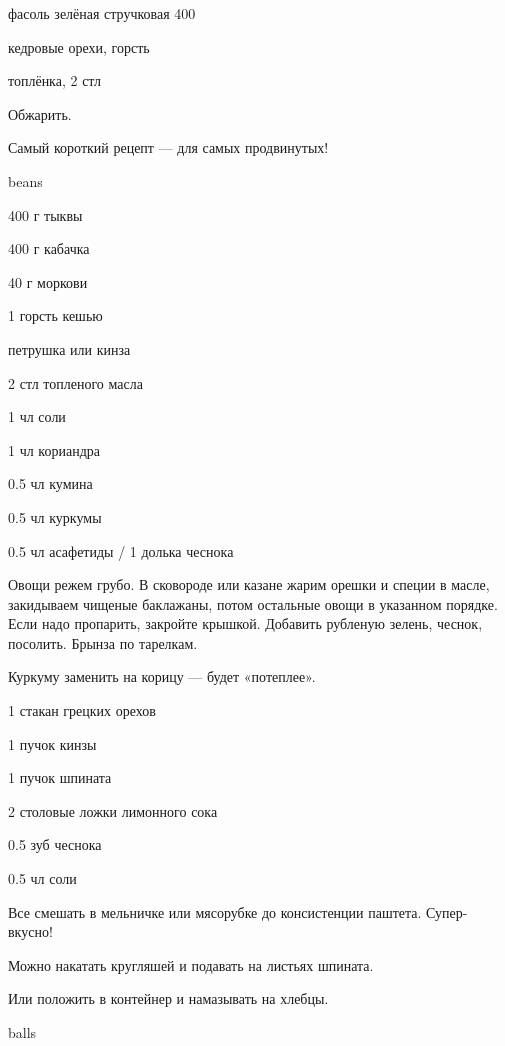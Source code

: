 {
\item фасоль зелёная стручковая 400
\item кедровые орехи, горсть
\item топлёнка, 2 стл
}{
\item[]
}{
Обжарить.
}{
\begin{advice}
\item Самый короткий рецепт — для самых продвинутых!
\end{advice}}{beans}



{
\item 400 г тыквы
\item 400 г кабачка
\item 40 г моркови
\item 1 горсть кешью
\item петрушка или кинза
\item 2 стл топленого масла
}{
\item 1 чл соли
\item 1 чл кориандра
\item 0.5 чл кумина
\item 0.5 чл куркумы
\item 0.5 чл асафетиды / 1 долька чеснока
}{
Овощи режем грубо. В сковороде или казане жарим орешки и специи в масле, закидываем чищеные баклажаны, потом остальные овощи в указанном порядке. Если надо пропарить, закройте крышкой. Добавить рубленую зелень, чеснок, посолить. Брынза по тарелкам.
}{
\begin{advice}
\item Куркуму заменить на корицу — будет «потеплее».
\end{advice}}{}



{
\item 1 стакан грецких орехов
\item 1 пучок кинзы
\item 1 пучок шпината
\item 2 столовые ложки лимонного сока
}{
\item 0.5 зуб чеснока
\item 0.5 чл соли
}{
Все смешать в мельничке или мясорубке до консистенции паштета. Супер-вкусно!
}{
\begin{advice}
\item Можно накатать кругляшей и подавать на листьях шпината.
\item Или положить в контейнер и намазывать на хлебцы.
\end{advice}}{balls}




